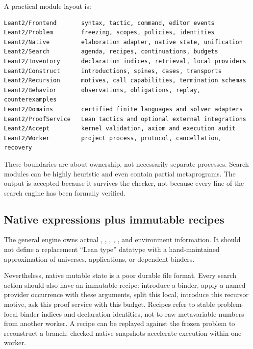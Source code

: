 A practical module layout is:
\par\noindent\begin{minipage}{\linewidth}
\begin{lstlisting}[language={}]
Leant2/Frontend       syntax, tactic, command, editor events
Leant2/Problem        freezing, scopes, policies, identities
Leant2/Native         elaboration adapter, native state, unification
Leant2/Search         agenda, recipes, continuations, budgets
Leant2/Inventory      declaration indices, retrieval, local providers
Leant2/Construct      introductions, spines, cases, transports
Leant2/Recursion      motives, call capabilities, termination schemas
Leant2/Behavior       observations, obligations, replay, counterexamples
Leant2/Domains        certified finite languages and solver adapters
Leant2/ProofService   Lean tactics and optional external integrations
Leant2/Accept         kernel validation, axiom and execution audit
Leant2/Worker         project process, protocol, cancellation, recovery
\end{lstlisting}
\end{minipage}\par

These boundaries are about ownership, not necessarily separate processes. Search modules can be highly heuristic and even contain partial metaprograms. The output is accepted because it survives the checker, not because every line of the search engine has been formally verified.

\subsection{Native expressions plus immutable recipes}

The general engine owns actual , , , , , and environment information. It should not define a replacement ``Lean type'' datatype with a hand-maintained approximation of universes, applications, or dependent binders.

Nevertheless, native mutable state is a poor durable file format. Every search action should also have an immutable recipe: introduce a binder, apply a named provider occurrence with these arguments, split this local, introduce this recursor motive, ask this proof service with this budget. Recipes refer to stable problem-local binder indices and declaration identities, not to raw metavariable numbers from another worker. A recipe can be replayed against the frozen problem to reconstruct a branch; checked native snapshots accelerate execution within one worker.

